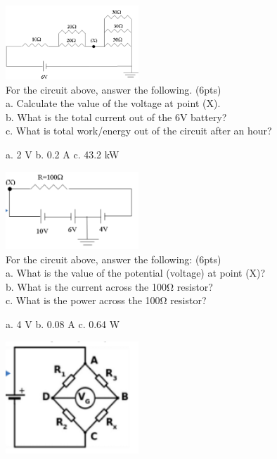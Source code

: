 \documentclass[10pt]{examdesign}
\begin{document}
\begin{shortanswer}[title={Short Answer, 52 pts total},rearrange=no,resetcounter=no]
        \begin{question}
        \includegraphics[width=5cm]{circuit1.png}
        \\For the circuit above, answer the following. (6pts)
        \\a. Calculate the value of the voltage at point (X). 
        \\b. What is the total current out of the 6V battery? 
        \\c. What is total work/energy out of the circuit after an hour? 
        \begin{answer}
        a. 2 V
        b. 0.2 A
        c. 43.2 kW
        \end{answer}
        \end{question}
        \begin{question}
        \includegraphics[width=5cm]{circuit2.png}
        \\For the circuit above, answer the following: (6pts)
        \\a. What is the value of the potential (voltage) at point (X)?
        \\b. What is the current across the 100Ω resistor? 
        \\c. What is the power across the 100Ω resistor?
        \begin{answer}
        a. 4 V
        b. 0.08 A
        c. 0.64 W
        \end{answer}
        \end{question}
        \begin{question}
        \includegraphics[width=5cm]{circuit3.png}

\end{question}
\end{shortanswer}
\end{document}
